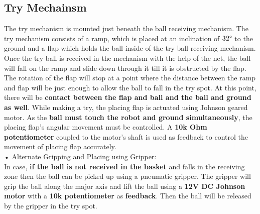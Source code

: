     \subsection{Try Mechainsm}
        The try mechanism is mounted just beneath the ball receiving mechanism. The try mechanism consists of a ramp, which is placed at an 
        inclination of \textbf{$32\degree$} to the ground and a flap which holds the ball inside of the try ball receiving mechanism. Once the try ball is received 
        in the mechanism with the help of the net, the ball will fall on the ramp and slide down through it till it is obstructed by the flap. 
        The rotation of the flap will stop at a point where the distance between the ramp and flap will be just enough to allow the ball to fall 
        in the try spot. At this point, there will be \textbf{contact between the flap and ball and the ball and ground as well}. While making a try, the 
        placing flap is actuated using Johnson geared motor. As the \textbf{ball must touch the robot and ground simultaneously}, the placing flap’s angular 
        movement must be controlled. A \textbf{10k Ohm potentiometer} coupled to the motor’s shaft is used as feedback to control the movement of placing 
        flap accurately.\\
        •  Alternate Gripping and Placing using Gripper:\\
            In case, \textbf{if the ball is not received in the basket} and falls in the receiving zone then the ball can be picked up using a pneumatic
            gripper. The gripper will grip the ball along the major axis and lift the ball using a \textbf{12V DC Johnson motor} with a \textbf{10k potentiometer}
            as \textbf{feedback}. Then the ball will be released by the gripper in the try spot.




